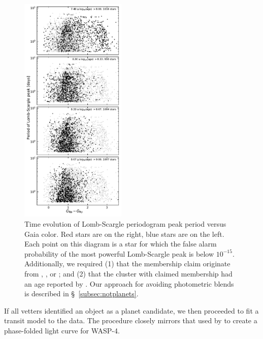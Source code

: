 \documentclass[12pt,twocolumn,tighten]{aastex62}
\begin{document}
\begin{figure}[!t]
	\begin{center}
		\leavevmode
		\includegraphics[width=0.45\textwidth]{LS_period_vs_color_and_age.pdf}
	\end{center}
	\vspace{-0.2cm}
	\caption{
    Time evolution of Lomb-Scargle periodogram peak period versus Gaia
    color.
		Red stars are on the right, blue stars are on the left.
		Each point on this diagram is a star for which the false alarm
		probability of the most powerful Lomb-Scargle peak is below
		$10^{-15}$.
		Additionally, we required (1) that the membership claim originate
		from \citet{cantat-gaudin_gaia_2018},
		\citet{Kharchenko_et_al_2013}, or \citet{gaia_hr_2018}; and (2)
		that the cluster with claimed membership had an age reported by
		\citet{Kharchenko_et_al_2013}.
		Our approach for avoiding photometric blends is described in
		\S~\ref{subsec:notplanets}.
		\label{fig:ls_peak_vs_time}
	}
\end{figure}


If all vetters identified an object as a planet candidate, we then
proceeded to fit a transit model to the data.  The procedure closely
mirrors that used by \citet{bouma_wasp-4b_2019} to create a
phase-folded light curve for WASP-4.
\end{document}
